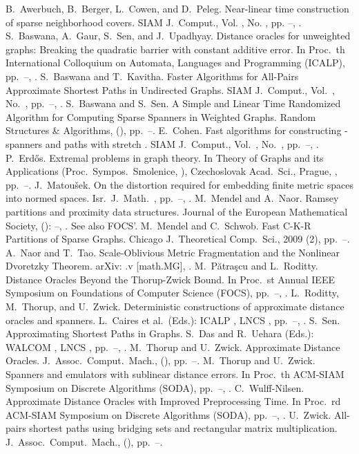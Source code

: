 \documentclass[11pt]{article}
\begin{document}
\begin{thebibliography}{99}
  B.~Awerbuch, B.~Berger, L.~Cowen, and D.~Peleg.
  Near-linear time construction of sparse neighborhood covers.
  SIAM J.~Comput., Vol. , No. , pp. --, .
  S.~Baswana, A.~Gaur, S.~Sen, and J.~Upadhyay.
  Distance oracles for unweighted graphs: Breaking the quadratic barrier with constant additive error.
  In Proc.~th International Colloquium on Automata, Languages and Programming (ICALP), pp.~--, .
  S.~Baswana and T.~Kavitha.
  Faster Algorithms for All-Pairs Approximate Shortest Paths in Undirected Graphs.
  SIAM J.~Comput., Vol.~, No.~, pp.~--, .
  S.~Baswana and S.~Sen.
  A Simple and Linear Time Randomized Algorithm for Computing Sparse Spanners in Weighted Graphs.
  Random Structures \& Algorithms,  (), pp.~--.
  E.~Cohen.
  Fast algorithms for constructing -spanners and paths with stretch .
  SIAM J.~Comput., Vol.~, No.~, pp.~--, .
  P.~Erd\H{o}s.
  Extremal problems in graph theory.
  In Theory of Graphs and its Applications (Proc.~Sympos.~Smolenice, ),
  Czechoslovak Acad.~Sci., Prague, , pp.~--.
  J.~Matou\v{s}ek.
  On the distortion required for embedding finite metric spaces into normed
  spaces.
  Isr.~J.~Math.~, pp.~--, .
  M.~Mendel and A.~Naor.
  Ramsey partitions and proximity data structures.
  Journal of the European Mathematical Society, (): --, . See also FOCS'.
  M.~Mendel and C.~Schwob.
  Fast C-K-R Partitions of Sparse Graphs.
  Chicago J.~Theoretical Comp.~Sci., 2009 (2), pp.~--.
  A.~Naor and T.~Tao.
  Scale-Oblivious Metric Fragmentation and the Nonlinear Dvoretzky Theorem.
  arXiv: .v [math.MG], .
  M.~P\u{a}tra\c{s}cu and L.~Roditty.
  Distance Oracles Beyond the Thorup-Zwick Bound.
  In Proc.~st Annual IEEE Symposium on Foundations of Computer Science (FOCS), pp.~--, .
  L.~Roditty, M.~Thorup, and U.~Zwick.
  Deterministic constructions of approximate distance oracles and spanners.
  L.~Caires et al.~(Eds.): ICALP , LNCS , pp.~--, .
  S.~Sen.
  Approximating Shortest Paths in Graphs.
  S.~Das and R.~Uehara (Eds.): WALCOM , LNCS , pp.~--, .
  M.~Thorup and U.~Zwick.
  Approximate Distance Oracles.
  J.~Assoc.~Comput.~Mach.,  (), pp.~--.
  M.~Thorup and U.~Zwick.
  Spanners and emulators with sublinear distance errors.
  In Proc.~th ACM-SIAM Symposium on Discrete Algorithms (SODA), pp.~--, .
  C.~Wulff-Nilsen.
  Approximate Distance Oracles with Improved Preprocessing Time.
  In Proc.~rd ACM-SIAM Symposium on Discrete Algorithms (SODA), pp.~--, .
  U.~Zwick.
  All-pairs shortest paths using bridging sets and rectangular matrix multiplication.
  J.~Assoc.~Comput.~Mach.,  (), pp.~--.
\end{thebibliography}
\end{document}
